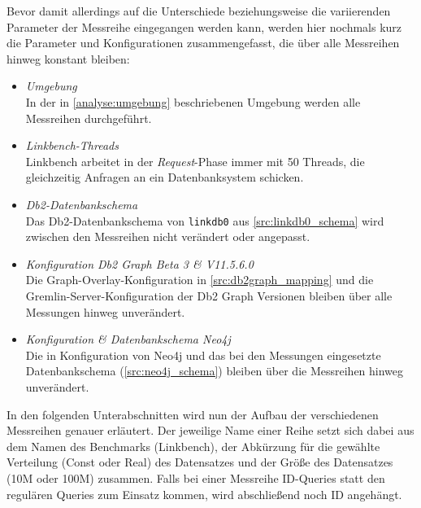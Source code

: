 Bevor damit allerdings auf die Unterschiede beziehungsweise die variierenden Parameter der Messreihe eingegangen werden kann, werden hier nochmals kurz die Parameter und Konfigurationen zusammengefasst, die über alle Messreihen hinweg konstant bleiben:
\begin{itemize}
    \item \textit{Umgebung}\\
    In der in \autoref{analyse:umgebung} beschriebenen Umgebung werden alle Messreihen durchgeführt. 
    \item \textit{Linkbench-Threads}\\
    Linkbench arbeitet in der \textit{Request}-Phase immer mit 50 Threads, die gleichzeitig Anfragen an ein Datenbanksystem schicken.
    \item \textit{Db2-Datenbankschema}\\
    Das Db2-Datenbankschema von \texttt{linkdb0} aus \autoref{src:linkdb0_schema} wird zwischen den Messreihen nicht verändert oder angepasst. 
    \item \textit{Konfiguration Db2 Graph Beta 3 \& V11.5.6.0}\\
    Die Graph-Overlay-Konfiguration in \autoref{src:db2graph_mapping} und die Gremlin-Server-Konfiguration der Db2 Graph Versionen bleiben über alle Messungen hinweg unverändert.
    \item \textit{Konfiguration \& Datenbankschema Neo4j}\\
    Die in Konfiguration von Neo4j und das bei den Messungen eingesetzte Datenbankschema (\autoref{src:neo4j_schema}) bleiben über die Messreihen hinweg unverändert. 
\end{itemize}

In den folgenden Unterabschnitten wird nun der Aufbau der verschiedenen Messreihen genauer erläutert. Der jeweilige Name einer Reihe setzt sich dabei aus dem Namen des Benchmarks (Linkbench), der Abkürzung für die gewählte Verteilung (Const oder Real) des Datensatzes und der Größe des Datensatzes (10M oder 100M) zusammen. Falls bei einer Messreihe ID-Queries statt den regulären Queries zum Einsatz kommen, wird abschließend noch ID angehängt.

